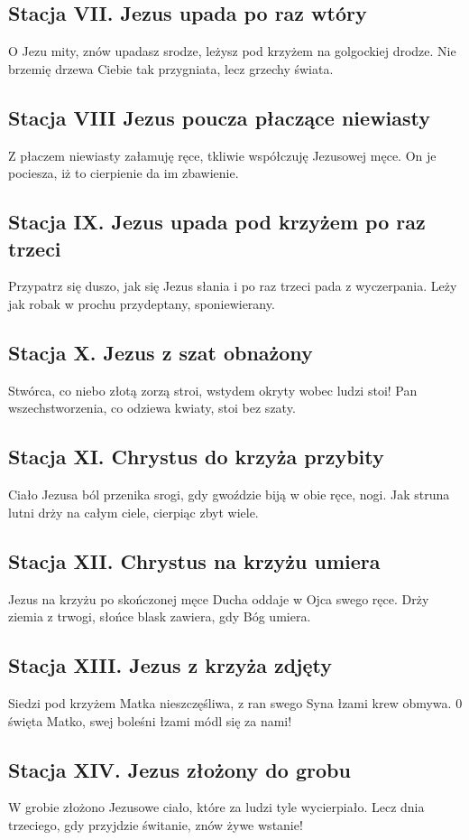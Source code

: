 \documentclass[wide,landscape,a4paper,12pt]{mwart}
\begin{document}
\begin{multicols}{2}
\subsection{Stacja VII. Jezus upada po raz wtóry}
O Jezu mity, znów upadasz srodze, leżysz pod krzyżem na golgockiej drodze.
Nie brzemię drzewa Ciebie tak przygniata, lecz grzechy świata.


\subsection{Stacja VIII Jezus poucza płaczące niewiasty}
Z płaczem niewiasty załamuję ręce, tkliwie współczuję Jezusowej męce.
On je pociesza, iż to cierpienie da im zbawienie.

\subsection{Stacja IX. Jezus upada pod krzyżem po raz trzeci}
Przypatrz się duszo, jak się Jezus słania i po raz trzeci pada z wyczerpania.
Leży jak robak w prochu przydeptany, sponiewierany.


\subsection{Stacja X. Jezus z szat obnażony}
Stwórca, co niebo złotą zorzą stroi, wstydem okryty wobec ludzi stoi!
Pan wszechstworzenia, co odziewa kwiaty, stoi bez szaty.

\subsection{Stacja XI. Chrystus do krzyża przybity}
Ciało Jezusa ból przenika srogi, gdy gwoździe biją w obie ręce, nogi.
Jak struna lutni drży na całym ciele, cierpiąc zbyt wiele.


\subsection{Stacja XII. Chrystus na krzyżu umiera}
Jezus na krzyżu po skończonej męce Ducha oddaje w Ojca swego ręce.
Drży ziemia z trwogi, słońce blask zawiera, gdy Bóg umiera.

\subsection{Stacja XIII. Jezus z krzyża zdjęty}
Siedzi pod krzyżem Matka nieszczęśliwa, z ran swego Syna łzami krew obmywa.
0 święta Matko, swej boleśni łzami módl się za nami!

\subsection{Stacja XIV. Jezus złożony do grobu}
W grobie złożono Jezusowe ciało, które za ludzi tyle wycierpiało.
Lecz dnia trzeciego, gdy przyjdzie świtanie, znów żywe wstanie!

\end{multicols}
\end{document}
